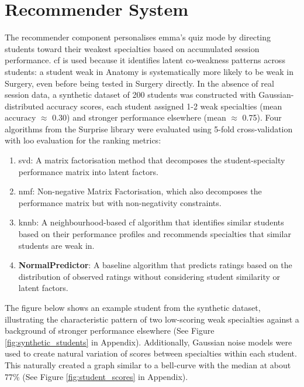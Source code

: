 \chapter{Recommender System}
\label{ch:crs}

The recommender component personalises \gls{emma}'s quiz mode by directing students toward their weakest specialties based on accumulated session performance. \gls{cf} is used because it identifies latent co-weakness patterns across students: a student weak in Anatomy is systematically more likely to be weak in Surgery, even before being tested in Surgery directly. In the absence of real session data, a synthetic dataset of 200 students was constructed with Gaussian-distributed accuracy scores, each student assigned 1-2 weak specialties (mean accuracy $\approx$ 0.30) and stronger performance elsewhere (mean $\approx$ 0.75). Four algorithms from the Surprise library \cite{hug2020} were evaluated using 5-fold cross-validation with \gls{loo} evaluation for the ranking metrics: 

\begin{enumerate}
    \item \gls{svd}: A matrix factorisation method that decomposes the student-specialty performance matrix into latent factors.
    \item \gls{nmf}: Non-negative Matrix Factorisation, which also decomposes the performance matrix but with non-negativity constraints.
    \item \gls{knnb}: A neighbourhood-based \gls{cf} algorithm that identifies similar students based on their performance profiles and recommends specialties that similar students are weak in.
    \item \textbf{NormalPredictor}: A baseline algorithm that predicts ratings based on the distribution of observed ratings without considering student similarity or latent factors.
\end{enumerate}

The figure below shows an example student from the synthetic dataset, illustrating the characteristic pattern of two low-scoring weak specialties against a background of stronger performance elsewhere (See Figure \ref{fig:synthetic_students} in Appendix). Additionally, Gaussian noise models were used to create natural variation of scores between specialties within each student. This naturally created a graph similar to a bell-curve with the median at about 77\% (See Figure \ref{fig:student_scores} in Appendix).

